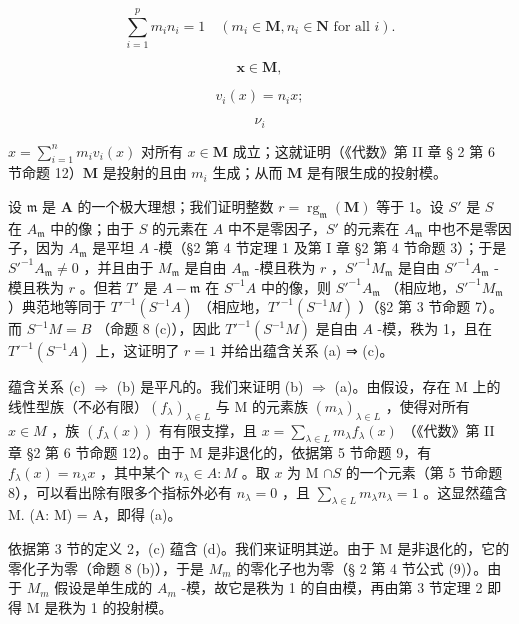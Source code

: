 \[
\sum_ {i = 1} ^ {p} m _ {i} n _ {i} = 1 \quad (m _ {i} \in \mathbf {M}, n _ {i} \in \mathbf {N} \text {   for   all   } i).\tag{9}
\]

\[
\boldsymbol {x} \in \mathbf {M},
\]

\[
v _ {i} (x) = n _ {i} x;
\]

\[
\nu_ {i}
\]

\(x = \sum_{i=1}^{n} m_i v_i(x)\) 对所有 \(x \in \mathbf{M}\) 成立；这就证明（《代数》第 II 章 § 2 第 6 节命题 12）\(\mathbf{M}\) 是投射的且由 \(m_i\) 生成；从而 \(\mathbf{M}\) 是有限生成的投射模。

设 \(\mathfrak{m}\) 是 \(\mathbf{A}\) 的一个极大理想；我们证明整数 \(r = \operatorname{rg}_{\mathfrak{m}}(\mathbf{M})\) 等于 1。设 \(S'\) 是 \(S\) 在 \(A_{\mathfrak{m}}\) 中的像；由于 \(S\) 的元素在 \(A\) 中不是零因子，\(S'\) 的元素在 \(A_{\mathfrak{m}}\) 中也不是零因子，因为 \(A_{\mathfrak{m}}\) 是平坦 \(A\) -模（§2 第 4 节定理 1 及第 I 章 §2 第 4 节命题 3）；于是 \(S'^{-1}A_{\mathfrak{m}} \neq 0\) ，并且由于 \(M_{\mathfrak{m}}\) 是自由 \(A_{\mathfrak{m}}\) -模且秩为 \(r\) ，\(S'^{-1}M_{\mathfrak{m}}\) 是自由 \(S'^{-1}A_{\mathfrak{m}}\) -模且秩为 \(r\) 。但若 \(T'\) 是 \(A - \mathfrak{m}\) 在 \(S^{-1}A\) 中的像，则 \(S'^{-1}A_{\mathfrak{m}}\) （相应地，\(S'^{-1}M_{\mathfrak{m}}\) ）典范地等同于 \(T'^{-1}(S^{-1}A)\) （相应地，\(T'^{-1}(S^{-1}M)\) ）（§2 第 3 节命题 7）。而 \(S^{-1}M = B\) （命题 8 (c)），因此 \(T'^{-1}(S^{-1}M)\) 是自由 \(A\) -模，秩为 1，且在 \(T'^{-1}(S^{-1}A)\) 上，这证明了 \(r = 1\) 并给出蕴含关系 (a) ⇒ (c)。

蕴含关系 (c) \(\Rightarrow\) (b) 是平凡的。我们来证明 (b) \(\Rightarrow\) (a)。由假设，存在 M 上的线性型族（不必有限）\((f_{\lambda})_{\lambda \in L}\) 与 M 的元素族 \((m_{\lambda})_{\lambda \in L}\) ，使得对所有 \(x \in M\) ，族 \((f_{\lambda}(x))\) 有有限支撑，且 \(x = \sum_{\lambda \in L} m_{\lambda} f_{\lambda}(x)\) （《代数》第 II 章 §2 第 6 节命题 12）。由于 M 是非退化的，依据第 5 节命题 9，有 \(f_{\lambda}(x) = n_{\lambda} x\) ，其中某个 \(n_{\lambda} \in A: M\) 。取 \(x\) 为 M \(\cap S\) 的一个元素（第 5 节命题 8），可以看出除有限多个指标外必有 \(n_{\lambda} = 0\) ，且 \(\sum_{\lambda \in L} m_{\lambda} n_{\lambda} = 1\) 。这显然蕴含 M. (A: M) = A，即得 (a)。

依据第 3 节的定义 2，(c) 蕴含 (d)。我们来证明其逆。由于 M 是非退化的，它的零化子为零（命题 8 (b)），于是 \(M_{m}\) 的零化子也为零（§ 2 第 4 节公式 (9)）。由于 \(M_{m}\) 假设是单生成的 \(A_{m}\) -模，故它是秩为 1 的自由模，再由第 3 节定理 2 即得 M 是秩为 1 的投射模。

